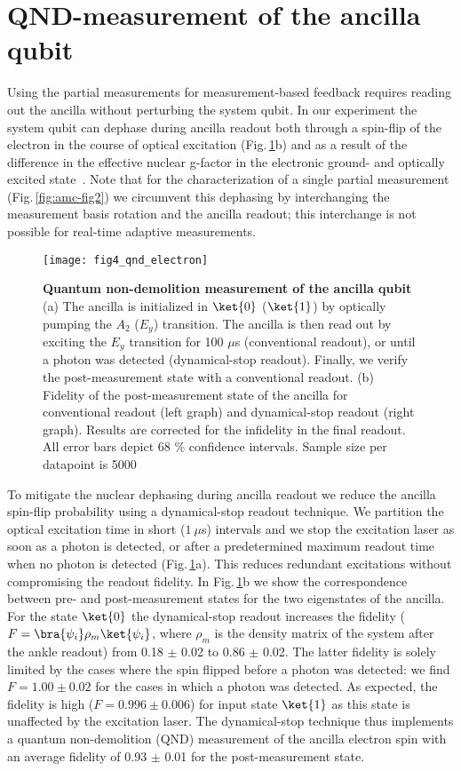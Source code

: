 \section{QND-measurement of the ancilla qubit}
Using the partial measurements for measurement-based feedback requires reading out the ancilla without perturbing the system qubit. In our experiment the system qubit can dephase during ancilla readout both through a spin-flip of the electron in the course of optical excitation (Fig.\,\ref{fig:amc-fig4}b) and as a result of the difference in the effective nuclear g-factor in the electronic ground- and optically excited state~\cite{Jiang_PRL_2008}. Note that for the characterization of a single partial measurement (Fig.\,\ref{fig:amc-fig2}) we circumvent this dephasing by interchanging the measurement basis rotation and the ancilla readout; this interchange is not possible for real-time adaptive measurements.

\begin{figure*}
	\centering
	\texttt{[image: fig4\_qnd\_electron]}
	\caption{\label{fig:amc-fig4} \textbf{Quantum non-demolition measurement of the ancilla qubit} (a) The ancilla is initialized in $\ket{0}$ ($\ket{1}$) by optically pumping the $A_2$ ($E_y$) transition. The ancilla is then read out by exciting the $E_y$ transition for 100 $\mu$s (conventional readout), or until a photon was detected (dynamical-stop readout). Finally, we verify the post-measurement state with a conventional readout. (b) Fidelity of the post-measurement state of the ancilla for conventional readout (left graph) and dynamical-stop readout (right graph). Results are corrected for the infidelity in the final readout.  All error bars depict 68 $\%$ confidence intervals. Sample size per datapoint is 5000 }
\end{figure*}

To mitigate the nuclear dephasing during ancilla readout we reduce the ancilla spin-flip probability using a dynamical-stop readout technique. We partition the optical excitation time in short ($1~ \mu$s) intervals and we stop the excitation laser as soon as a photon is detected, or after a predetermined maximum readout time when no photon is detected (Fig.\,\ref{fig:amc-fig4}a). This reduces redundant excitations without compromising the readout fidelity. In Fig.\,\ref{fig:amc-fig4}b we show the correspondence between pre- and post-measurement states for the two eigenstates of the ancilla. For the state $\ket{0}$ the dynamical-stop readout increases the fidelity ($F = \bra{\psi_i}\rho_m \ket{\psi_i}$, where $\rho_m$ is the density matrix of the system after the ankle readout) from 0.18 $\pm$ 0.02 to 0.86 $\pm$ 0.02. The latter fidelity is solely limited by the cases where the spin flipped before a photon was detected: we find $F = 1.00 \pm 0.02$ for the cases in which a photon was detected. As expected, the fidelity is high ($F = 0.996 \pm 0.006$) for input state $\ket{1}$ as this state is unaffected by the excitation laser. The dynamical-stop technique thus implements a quantum non-demolition (QND) measurement of the ancilla electron spin with an average fidelity of 0.93 $\pm$ 0.01 for the post-measurement state.

